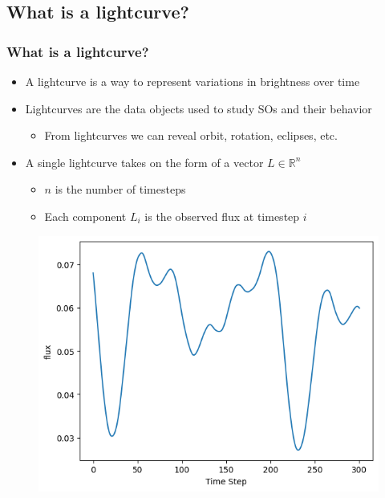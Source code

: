 \documentclass[
	11pt, %
]{beamer}
\begin{document}
\subsection{What is a lightcurve?}
\begin{frame}
	\frametitle{What is a lightcurve?}
	\begin{itemize}
		\item
		A lightcurve is a way to represent variations in brightness over time 
		\item
		Lightcurves are the data objects used to study SOs and their behavior
		\begin{itemize}
			\item
			From lightcurves we can reveal orbit, rotation, eclipses, etc.
		\end{itemize}
		\item
		A single lightcurve takes on the form of a vector $L\in\mathbb{R}^{n}$
		\begin{itemize}
			\item
				$n$ is the number of timesteps
			\item
				Each component $L_i$ is the observed flux at timestep $i$
		\end{itemize}

	\end{itemize}
	\begin{figure}
	\includegraphics[scale=0.4]{../LightCurveExample.png}
	\end{figure}
\end{frame}
\end{document}
